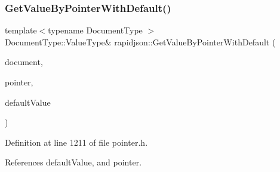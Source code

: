 \subsubsection{\texorpdfstring{GetValueByPointerWithDefault()}{GetValueByPointerWithDefault()}\hspace{0.1cm}{\footnotesize\ttfamily [5/8]}}
{\footnotesize\ttfamily template$<$typename Document\+Type $>$ \\
Document\+Type\+::\+Value\+Type\& rapidjson\+::\+Get\+Value\+By\+Pointer\+With\+Default (\begin{DoxyParamCaption}\item[{Document\+Type \&}]{document,  }\item[{const \mbox{\hyperlink{classrapidjson_1_1_generic_pointer}{Generic\+Pointer}}$<$ typename Document\+Type\+::\+Value\+Type $>$ \&}]{pointer,  }\item[{const typename Document\+Type\+::\+Value\+Type \&}]{default\+Value }\end{DoxyParamCaption})}



Definition at line 1211 of file pointer.\+h.


\begin{DoxyCode}{0}

\end{DoxyCode}


References default\+Value, and pointer.

\mbox{\label{namespacerapidjson_a77cbd080374924fd75a24cedb2a017b2}} 
